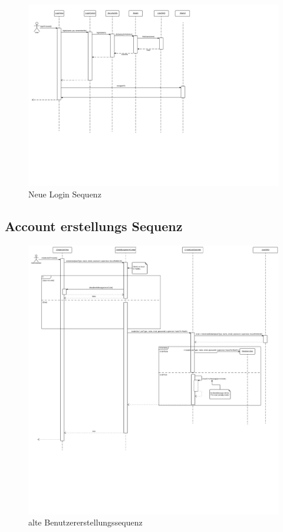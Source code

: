 \begin{figure}
  \centering
    \includegraphics[width=\linewidth]{Login-Sequenz-new.pdf}
   \caption{Neue Login Sequenz}
\end{figure}

\subsection{Account erstellungs Sequenz}

\begin{figure}
  \centering
    \includegraphics[width=\linewidth]{Create-user-account.pdf}
   \caption{alte Benutzererstellungssequenz}
\end{figure}

